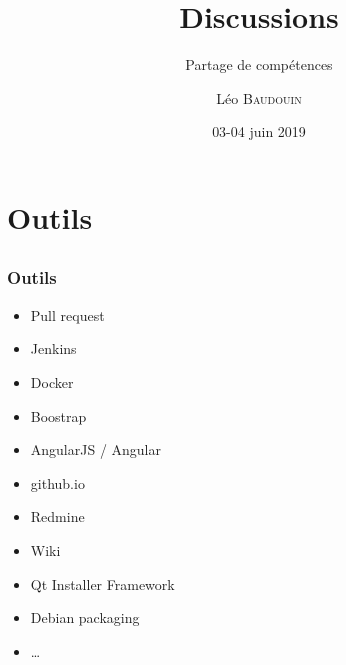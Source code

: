 \documentclass{beamer}
\title{Discussions}
\subtitle{Partage de compétences}
\author{L\'eo \textsc{Baudouin}}
\institute{
  {\url{baudouin.leo @ gmail.com}}
}
\date{03-04 juin 2019}
\begin{document}
\begin{frame}
  \titlepage
\end{frame}




\section{Outils}
\subsection{}

\begin{frame}
  \frametitle{Outils}
  \begin{block}{}
  \begin{itemize}[<+->]
  \item Pull request
  \item Jenkins
  \item Docker
  \item Boostrap
  \item AngularJS / Angular
  \item github.io
  \item Redmine
  \item Wiki
  \item Qt Installer Framework
  \item Debian packaging
  \item \dots
  \end{itemize}
  \end{block}  
\end{frame}

\end{document}
